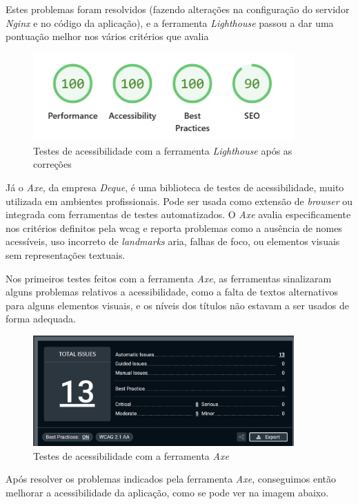 Estes problemas foram resolvidos (fazendo alterações na configuração do servidor \textit{Nginx} e no código da aplicação), e a ferramenta \textit{Lighthouse} passou a dar uma pontuação melhor nos vários critérios que avalia

\begin{figure}[H]
\centering
\includegraphics[max width=10cm]{./img/lh_after}
\caption{Testes de acessibilidade com a ferramenta \textit{Lighthouse} após as correções}
\end{figure}

Já o \textit{Axe}\cite{axe}, da empresa \textit{Deque}, é uma biblioteca de testes de acessibilidade, muito utilizada em ambientes profissionais. Pode ser usada como extensão de \textit{browser} ou integrada com ferramentas de testes automatizados. O \textit{Axe} avalia especificamente nos critérios definitos pela \gls{wcag} e reporta problemas como a ausência de nomes acessíveis, uso incorreto de \textit{landmarks} \gls{aria}, falhas de foco, ou elementos visuais sem representações textuais.

Nos primeiros testes feitos com a ferramenta \textit{Axe}, as ferramentas sinalizaram alguns problemas relativos a acessibilidade, como a falta de textos alternativos para alguns elementos visuais, e os níveis dos títulos não estavam a ser usados de forma adequada.


\begin{figure}[H]
    \centering
    \includegraphics[max width=10cm]{./img/axe}
    \caption{Testes de acessibilidade com a ferramenta \textit{Axe}}
    \end{figure}


Após resolver os problemas indicados pela ferramenta \textit{Axe}, conseguimos então melhorar a acessibilidade da aplicação, como se pode ver na imagem abaixo.

